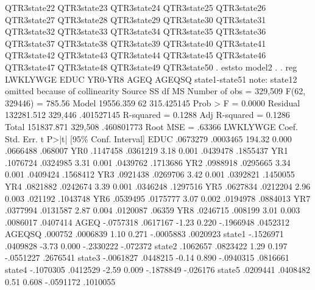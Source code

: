               QTR3state22 QTR3state23 QTR3state24 QTR3state25 QTR3state26
               QTR3state27 QTR3state28 QTR3state29 QTR3state30 QTR3state31
               QTR3state32 QTR3state33 QTR3state34 QTR3state35 QTR3state36
               QTR3state37 QTR3state38 QTR3state39 QTR3state40 QTR3state41
               QTR3state42 QTR3state43 QTR3state44 QTR3state45 QTR3state46
               QTR3state47 QTR3state48 QTR3state49 QTR3state50
{\smallskip}
. eststo model2
{\smallskip}
. 
. reg  LWKLYWGE EDUC  YR0-YR8 AGEQ AGEQSQ state1-state51
note: state12 omitted because of collinearity
{\smallskip}
      Source {\VBAR}       SS           df       MS      Number of obs   =   329,509
   F(62, 329446)   =    785.56
       Model {\VBAR}   19556.359        62  315.425145   Prob > F        =    0.0000
    Residual {\VBAR}  132281.512   329,446  .401527145   R-squared       =    0.1288
   Adj R-squared   =    0.1286
       Total {\VBAR}  151837.871   329,508  .460801773   Root MSE        =    .63366
{\smallskip}
    LWKLYWGE {\VBAR}      Coef.   Std. Err.      t    P>|t|     [95\% Conf. Interval]
        EDUC {\VBAR}   .0673279   .0003465   194.32   0.000     .0666488     .068007
         YR0 {\VBAR}   .1147458   .0361219     3.18   0.001     .0439478    .1855437
         YR1 {\VBAR}   .1076724   .0324985     3.31   0.001     .0439762    .1713686
         YR2 {\VBAR}   .0988918   .0295665     3.34   0.001     .0409424    .1568412
         YR3 {\VBAR}   .0921438   .0269706     3.42   0.001     .0392821    .1450055
         YR4 {\VBAR}   .0821882   .0242674     3.39   0.001     .0346248    .1297516
         YR5 {\VBAR}   .0627834   .0212204     2.96   0.003      .021192    .1043748
         YR6 {\VBAR}   .0539495   .0175777     3.07   0.002     .0194978    .0884013
         YR7 {\VBAR}   .0377994   .0131587     2.87   0.004     .0120087      .06359
         YR8 {\VBAR}   .0246715    .008199     3.01   0.003     .0086017    .0407414
        AGEQ {\VBAR}  -.0757318   .0617167    -1.23   0.220    -.1966948    .0452312
      AGEQSQ {\VBAR}    .000752   .0006839     1.10   0.271    -.0005883    .0020923
      state1 {\VBAR}  -.1526971   .0409828    -3.73   0.000    -.2330222    -.072372
      state2 {\VBAR}   .1062657   .0823422     1.29   0.197    -.0551227    .2676541
      state3 {\VBAR}  -.0061827   .0448215    -0.14   0.890    -.0940315    .0816661
      state4 {\VBAR}  -.1070305   .0412529    -2.59   0.009    -.1878849    -.026176
      state5 {\VBAR}   .0209441   .0408482     0.51   0.608    -.0591172    .1010055

